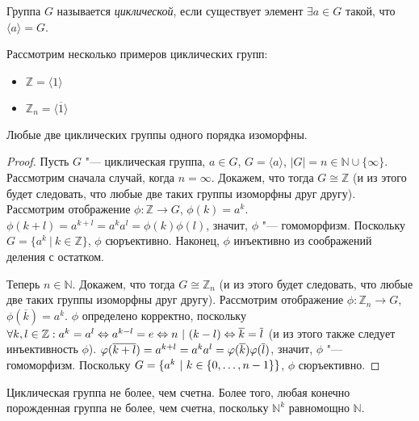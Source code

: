 \begin{definition}
	Группа $G$ называется \textit{циклической}, если существует элемент $\exists a \in G$ такой, что $\langle a\rangle = G$.
\end{definition}

\begin{example}
	Рассмотрим несколько примеров циклических групп:
	\begin{itemize}
		\item $\mathbb{Z} = \langle 1 \rangle$
		\item $\mathbb{Z}_n = \langle \overline{1} \rangle$
	\end{itemize}
\end{example}

\begin{theorem}
	Любые две циклических группы одного порядка изоморфны.
\end{theorem}

\begin{proof}
	Пусть $G$ "--- циклическая группа, $a \in G$, $G = \langle a\rangle$, $|G| = n \in \mathbb{N}\cup\{\infty\}$. Рассмотрим сначала случай, когда $n = \infty$. Докажем, что тогда $G \cong \mathbb{Z}$ (и из этого будет следовать, что любые две таких группы изоморфны друг другу). Рассмотрим отображение $\phi: \mathbb{Z} \rightarrow G$, $\phi(k) = a^k$. $\phi(k + l) = a^{k + l} = a^ka^l = \phi(k)\phi(l)$, значит, $\phi$ "--- гомоморфизм. Поскольку $G = \{a^k~|~k \in \mathbb{Z}\}$, $\phi$ сюръективно. Наконец, $\phi$ инъективно из соображений деления с остатком.
	
	Теперь $n \in \mathbb{N}$. Докажем, что тогда $G \cong \mathbb{Z}_n$ (и из этого будет следовать, что любые две таких группы изоморфны друг другу). Рассмотрим отображение $\phi: \mathbb{Z}_n \rightarrow G$, $\phi(\overline{k}) = a^k$. $\phi$ определено корректно, поскольку $\forall k, l \in \mathbb{Z}: a^k = a^l \Leftrightarrow a^{k - l} = e \Leftrightarrow n~|~(k - l) \hm{\Leftrightarrow} \overline{k} = \overline{l}$ (и из этого также следует инъективность $\phi$). $\phi(\overline{k + l}) \hm{=} a^{k + l} = a^ka^l = \phi(\overline{k})\phi(\overline{l})$, значит, $\phi$ "--- гомоморфизм. Поскольку $G \hm{=} \{a^k~|~k \in \{0, \dots, n - 1\}\}$, $\phi$ сюръективно.
\end{proof}

\begin{note}
	Циклическая группа не более, чем счетна. Более того, любая конечно порожденная группа не более, чем счетна, поскольку $\mathbb{N}^k$ равномощно $\mathbb{N}$.
\end{note}

